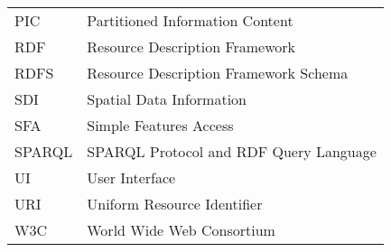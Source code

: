 \begin{longtable}{lp{11cm}}
  
  PIC & Partitioned Information Content   \\
  
  
  RDF &  Resource Description Framework\\
  RDFS & Resource Description Framework Schema\\
  SDI  & Spatial Data Information\\
  SFA & Simple Features Access \\
  SPARQL	 & SPARQL Protocol and RDF Query Language\\
  UI  & User Interface \\
  URI &	Uniform Resource Identifier\\
  
  W3C & World Wide Web Consortium \\
  







  
  
 
\end{longtable}
